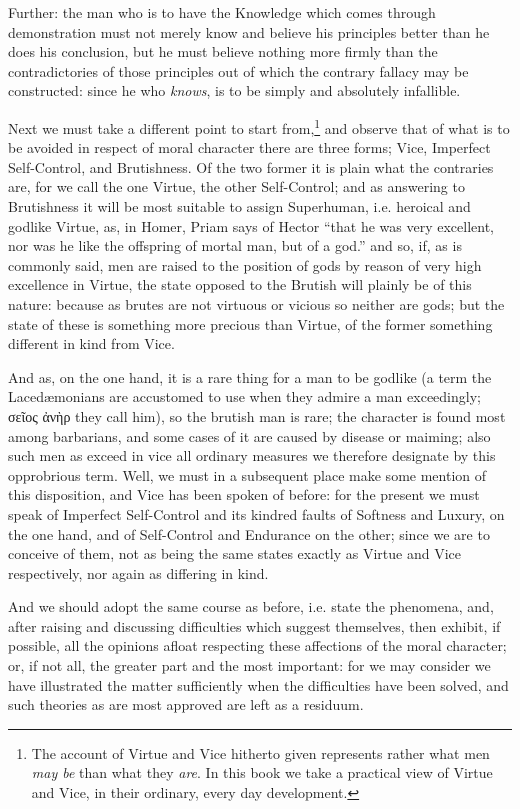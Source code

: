 Further: the man who is to have the Knowledge which comes through demonstration
must not merely know and believe his principles better than he does his
conclusion, but he must believe nothing more firmly than the contradictories of
those principles out of which the contrary fallacy may be constructed: since he
who \emph{knows}, is to be simply and absolutely infallible.



Next we must take a different point to start from,\footnote{The account of Virtue and Vice hitherto given represents rather what men \emph{may
be} than what they \emph{are}. In this book we take a practical view of
Virtue and Vice, in their ordinary, every day development.}
and observe that of what is to be avoided in respect of moral character there
are three forms; Vice, Imperfect Self-Control, and Brutishness. Of the two
former it is plain what the contraries are, for we call the one Virtue, the
other Self-Control; and as answering to Brutishness it will be most suitable to
assign Superhuman, i.e. heroical and godlike Virtue, as, in Homer, Priam says
of Hector “that he was very excellent, nor was he like the offspring of
mortal man, but of a god.” and so, if, as is commonly said, men are
raised to the position of gods by reason of very high excellence in Virtue, the
state opposed to the Brutish will plainly be of this nature: because as brutes
are not virtuous or vicious so neither are gods; but the state of these is
something more precious than Virtue, of the former something different in kind
from Vice.

And as, on the one hand, it is a rare thing for a man to be godlike (a term the
Lacedæmonians are accustomed to use when they admire a man exceedingly;
σεῖος ἀνὴρ they call him), so
the brutish man is rare; the character is found most among barbarians, and some
cases of it are caused by disease or maiming; also such men as exceed in vice
all ordinary measures we therefore designate by this opprobrious term. Well, we
must in a subsequent place make some mention of this disposition, and Vice has
been spoken of before: for the present we must speak of Imperfect Self-Control
and its kindred faults of Softness and Luxury, on the one hand, and of
Self-Control and Endurance on the other; since we are to conceive of them, not
as being the same states exactly as Virtue and Vice respectively, nor again as
differing in kind.

And we should adopt the same course as before, i.e. state the phenomena, and,
after raising and discussing difficulties which suggest themselves, then
exhibit, if possible, all the opinions afloat respecting these affections of
the moral character; or, if not all, the greater part and the most important:
for we may consider we have illustrated the matter sufficiently when the
difficulties have been solved, and such theories as are most approved are left
as a residuum.

